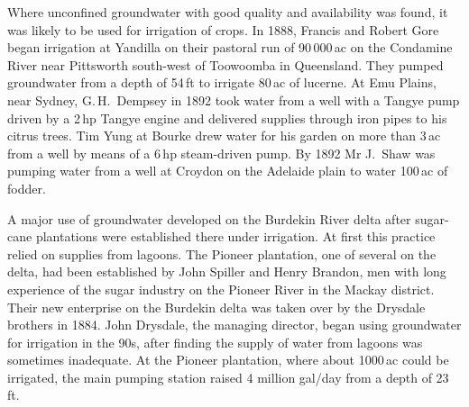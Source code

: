 Where unconfined groundwater with good quality and availability was
found, it was likely to be used for irrigation of crops.  In 1888,
Francis and Robert Gore began irrigation at Yandilla on their pastoral
run of 90\,000\,ac on the Condamine River near Pittsworth south-west
of Toowoomba in Queensland.  They pumped groundwater from a depth of
54\,ft to irrigate 80\,ac of lucerne.  At Emu Plains, near Sydney, G.\,H.~Dempsey in 1892 took
water from a well with a Tangye pump driven by a 2\,hp Tangye engine
and delivered supplies through iron pipes to his citrus trees.  Tim Yung at Bourke drew water
for his garden on more than 3\,ac from a well by means of a 6\,hp
steam-driven pump. By 1892 Mr J.~Shaw
was pumping water from a well at Croydon on the Adelaide plain to
water 100\,ac of fodder.

A major use of groundwater developed on the Burdekin River delta after
sugar-cane plantations were established there under irrigation.  At
first this practice relied on supplies from lagoons.  The Pioneer
plantation, one of several on the delta, had been established by John
Spiller and Henry Brandon, men with long experience of the sugar
industry on the Pioneer River in the Mackay district.  Their new
enterprise on the Burdekin delta was taken over by the Drysdale
brothers in 1884.  John Drysdale, the managing director, began using
groundwater for irrigation in the 90s, after finding the supply of
water from lagoons was sometimes inadequate.  At the Pioneer
plantation, where about 1000\,ac could be irrigated, the main pumping
station raised 4 million gal/day from a depth of
23\,ft.

